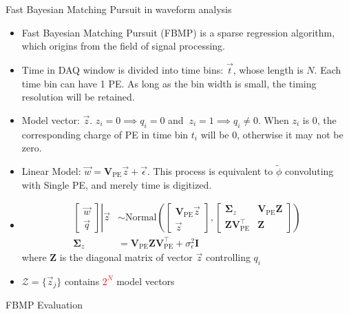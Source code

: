 \documentclass[final]{beamer}
\newlength{\colwidth}
\begin{document}
\begin{frame}[t]
\begin{columns}[t]
\begin{column}{\colwidth}
\begin{block}{Fast Bayesian Matching Pursuit\cite{schniter_fast_2008} in waveform analysis}
    \begin{itemize}
      \item Fast Bayesian Matching Pursuit (FBMP) is a sparse regression algorithm, which origins from the field of signal processing. 
      \item Time in DAQ window is divided into time bins: $\vec{t}$, whose length is $N$. Each time bin can have 1 PE. As long as the bin width is small, the timing resolution will be retained. 
      \item Model vector: $\vec{z}$. $z_i=0\implies q_i=0$ and $\ z_i=1\implies q_i\neq0$. When $z_i$ is 0, the corresponding charge of PE in time bin $t_i$ will be 0, otherwise it may not be zero. 
      \item Linear Model: $\vec{w} = \bm{V}_\mathrm{PE}\vec{z} + \vec{\epsilon}$. This process is equivalent to $\tilde{\phi}$ convoluting with Single PE, and merely time is digitized. 
      \item 
          \begin{align*}
              \left.
              \begin{bmatrix}
                  \vec{w} \\
                  \vec{q}
              \end{bmatrix}
              \right\vert\vec{z}
              &\sim \mathrm{Normal}\left(
              \begin{bmatrix}
                  \bm{V}_\mathrm{PE}\vec{z} \\
                  \vec{z}
              \end{bmatrix}, 
              \begin{bmatrix}
                  \bm{\Sigma}_z & \bm{V}_\mathrm{PE}\bm{Z} \\
                  \bm{Z}\bm{V}_\mathrm{PE}^\intercal & \bm{Z}
              \end{bmatrix}
              \right) \\
              \bm{\Sigma}_z &= \bm{V}_\mathrm{PE}\bm{Z}\bm{V}_\mathrm{PE}^\intercal+\sigma_\epsilon^2\bm{I}
          \end{align*}
        where $\bm{Z}$ is the diagonal matrix of vector $\vec{z}$ controlling $q_i$ 
        \item $\mathcal{Z}=\{\vec{z}_j\}$ contains \textcolor{red}{$2^{N}$} model vectors
    \end{itemize}

  \end{block}

  \begin{block}{FBMP Evaluation}


\end{block}
\end{column}
\end{columns}
\end{frame}
\end{document}
